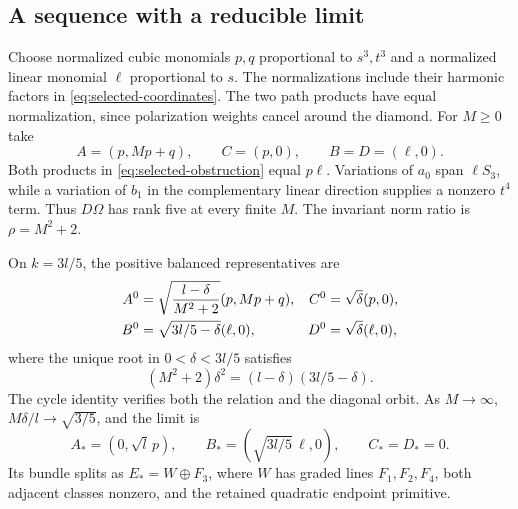 \documentclass[11pt]{amsart}
\theoremstyle{definition}
\theoremstyle{remark}
\begin{document}
\subsection{A sequence with a reducible limit}
Choose normalized cubic monomials $p,q$ proportional to $s^3,t^3$
and a normalized linear monomial $\ell$ proportional to $s$. The
normalizations include their harmonic factors in
\eqref{eq:selected-coordinates}. The two path products have equal
normalization, since polarization weights cancel around the diamond.
For $M\ge0$ take
\begin{equation}\label{eq:M-family}
 A=(p,Mp+q),\qquad C=(p,0),\qquad B=D=(\ell,0).
\end{equation}
Both products in \eqref{eq:selected-obstruction} equal $p\ell$.
Variations of $a_0$ span $\ell S_3$, while a variation of $b_1$
in the complementary linear direction supplies a nonzero $t^4$ term.
Thus $D\Omega$ has rank five at every finite $M$.
The invariant norm ratio is $\rho=M^2+2$.

On $k=3l/5$, the positive balanced representatives are
\begin{align}
 A^0&=\sqrt{\frac{l-\delta}{M^2+2}}(p,Mp+q),&
 C^0&=\sqrt\delta(p,0),\notag\\
 B^0&=\sqrt{3l/5-\delta}(\ell,0),&
 D^0&=\sqrt\delta(\ell,0),\label{eq:balanced-M}
\end{align}
where the unique root in $0<\delta<3l/5$ satisfies
\begin{equation}\label{eq:delta-equation}
 (M^2+2)\delta^2=(l-\delta)(3l/5-\delta).
\end{equation}
The cycle identity verifies both the relation and the diagonal orbit.
As $M\to\infty$, $M\delta/l\to\sqrt{3/5}$, and the limit is
\begin{equation}\label{eq:endpoint-coefficients}
 A_*=(0,\sqrt l\,p),\qquad B_*=(\sqrt{3l/5}\,\ell,0),
 \qquad C_*=D_*=0.
\end{equation}
Its bundle splits as $E_*=W\oplus F_3$, where $W$ has graded
lines $F_1,F_2,F_4$, both adjacent classes nonzero, and the retained
quadratic endpoint primitive.
\end{document}
